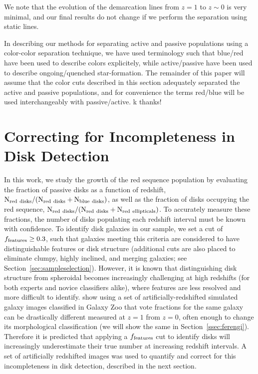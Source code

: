 \documentclass[useAMS,usenatbib]{mn2e}
\begin{document}
We note that the evolution of the demarcation lines from $z=1$ to $z\sim0$ is very minimal, and our final results do not change if we perform the separation using static lines.


In describing our methods for separating active and passive populations using a color-color separation technique, we have used terminology such that blue/red have been used to describe colors explicitely, while active/passive have been used to describe ongoing/quenched star-formation. The remainder of this paper will assume that the color cuts described in this section adequately separated the active and passive populations, and for convenience the terms red/blue will be used interchangeably with passive/active. k thanks! 

\section{Correcting for Incompleteness in Disk Detection}
\label{sec:correction}
In this work, we study the growth of the red sequence population by evaluating the fraction of passive disks as a function of redshift, $\rm N_{red~disks}/(N_{red~disks}+N_{blue~disks})$, as well as the fraction of disks occupying the red sequence, $\rm N_{red~disks}/(N_{red~disks}+N_{red~ellipticals})$. To accurately measure these fractions, the number of disks populating each redshift interval must be known with confidence. To identify disk galaxies in our sample, we set a cut of $f_{\rm features}\ge0.3$, such that galaxies meeting this criteria are considered to have distinguishable features or disk structure (additional cuts are also placed to eliminate clumpy, highly inclined, and merging galaxies; see Section~\ref{sec:sampleselection}). However, it is known that distinguishing disk structure from spheroidal becomes increasingly challenging at high redshifts (for both experts and novice classifiers alike), where features are less resolved and more difficult to identify. \citet{Willett2016} show using a set of artificially-redshifted simulated galaxy images classified in Galaxy Zoo that vote fractions for the same galaxy can be drastically different measured at $z=1$ from $z=0$, often enough to change its morphological classification (we will show the same in Section~\ref{ssec:ferengi}).  Therefore it is predicted that applying a $f_{\rm features}$ cut to identify disks will increasingly underestimate their true number at increasing redshift intervals. A set of artificially redshifted images was used to quantify and correct for this incompleteness in disk detection, described in the next section.
 
\end{document}
